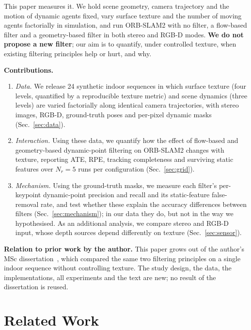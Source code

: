 \documentclass[conference]{IEEEtran}
\begin{document}
This paper measures it. We hold scene geometry, camera trajectory and the motion of dynamic agents fixed, vary surface texture and the number of moving agents factorially in simulation, and run ORB-SLAM2 with no filter, a flow-based filter and a geometry-based filter in both stereo and RGB-D modes. \textbf{We do not propose a new filter}; our aim is to quantify, under controlled texture, when existing filtering principles help or hurt, and why.

\textbf{Contributions.}
\begin{enumerate}
\item[C1] \emph{Data.} We release 24 synthetic indoor sequences in which surface texture (four levels, quantified by a reproducible texture metric) and scene dynamics (three levels) are varied factorially along identical camera trajectories, with stereo images, RGB-D, ground-truth poses and per-pixel dynamic masks (Sec.~\ref{sec:data}).
\item[C2] \emph{Interaction.} Using these data, we quantify how the effect of flow-based and geometry-based dynamic-point filtering on ORB-SLAM2 changes with texture, reporting ATE, RPE, tracking completeness and surviving static features over $N_r=5$ runs per configuration (Sec.~\ref{sec:grid}).
\item[C3] \emph{Mechanism.} Using the ground-truth masks, we measure each filter's per-keypoint dynamic-point precision and recall and its static-feature false-removal rate, and test whether these explain the accuracy differences between filters (Sec.~\ref{sec:mechanism}); in our data they do, but not in the way we hypothesised. As an additional analysis, we compare stereo and RGB-D input, whose depth sources depend differently on texture (Sec.~\ref{sec:sensor}).
\end{enumerate}

\textbf{Relation to prior work by the author.} This paper grows out of the author's MSc dissertation~\cite{xue2022msc}, which compared the same two filtering principles on a single indoor sequence without controlling texture. The study design, the data, the implementations, all experiments and the text are new; no result of the dissertation is reused.

\section{Related Work}
\label{sec:related}
\end{document}
